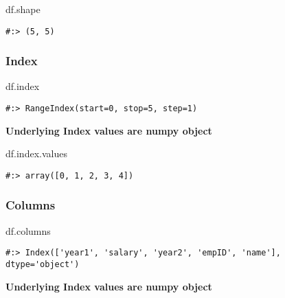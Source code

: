 \documentclass[
]{book}
\newenvironment{Shaded}{\begin{snugshade}}{\end{snugshade}}
\newcommand{\NormalTok}[1]{#1}
\begin{document}
\begin{Shaded}
\begin{Highlighting}[]
\NormalTok{df.shape}
\end{Highlighting}
\end{Shaded}

\begin{verbatim}
#:> (5, 5)
\end{verbatim}

\hypertarget{index}{%
\subsubsection{Index}\label{index}}

\begin{Shaded}
\begin{Highlighting}[]
\NormalTok{df.index}
\end{Highlighting}
\end{Shaded}

\begin{verbatim}
#:> RangeIndex(start=0, stop=5, step=1)
\end{verbatim}

\textbf{Underlying Index values are numpy object}

\begin{Shaded}
\begin{Highlighting}[]
\NormalTok{df.index.values}
\end{Highlighting}
\end{Shaded}

\begin{verbatim}
#:> array([0, 1, 2, 3, 4])
\end{verbatim}

\hypertarget{columns}{%
\subsubsection{Columns}\label{columns}}

\begin{Shaded}
\begin{Highlighting}[]
\NormalTok{df.columns}
\end{Highlighting}
\end{Shaded}

\begin{verbatim}
#:> Index(['year1', 'salary', 'year2', 'empID', 'name'], dtype='object')
\end{verbatim}

\textbf{Underlying Index values are numpy object}
\end{document}
